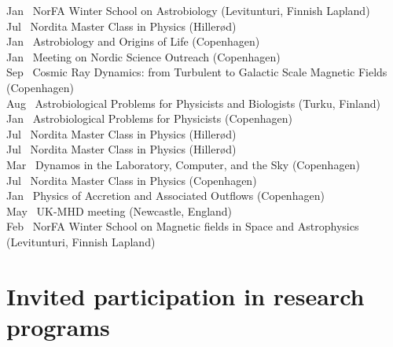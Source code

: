 \documentclass{article}
\begin{document}
\begin{tabbing}
Jan~   \> NorFA Winter School on Astrobiology (Levitunturi, Finnish Lapland)\\
Jul~   \> Nordita Master Class in Physics (Hiller\o d)\\
Jan~   \> Astrobiology and Origins of Life (Copenhagen)\\
Jan~   \> Meeting on Nordic Science Outreach (Copenhagen)\\
Sep~   \> Cosmic Ray Dynamics: from Turbulent to Galactic Scale Magnetic Fields (Copenhagen)\\
Aug~   \> Astrobiological Problems for Physicists and Biologists (Turku, Finland)\\
Jan~   \> Astrobiological Problems for Physicists (Copenhagen)\\
Jul~   \> Nordita Master Class in Physics (Hiller\o d)\\
Jul~   \> Nordita Master Class in Physics (Hiller\o d)\\
Mar~   \> Dynamos in the Laboratory, Computer, and the Sky (Copenhagen)\\
Jul~   \> Nordita Master Class in Physics (Copenhagen)\\
Jan~   \> Physics of Accretion and Associated Outflows (Copenhagen)\\
May~   \> UK-MHD meeting (Newcastle, England)\\
Feb~   \> NorFA Winter School on Magnetic fields in Space and Astrophysics (Levitunturi, Finnish Lapland)\\
\end{tabbing}
\vspace{-8mm}
 
\section*{Invited participation in research programs}
\end{document}
